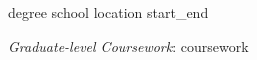 

\begin{cventries}

  \cventry
    { {{degree}} } %
    { {{school}} } %
    { {{location}} } %
    { {{start_end}} } %
    {
      \begin{cvitems} %
        \item {\textit{Graduate-level Coursework}: {{coursework}} }
      \end{cvitems}
    }
\end{cventries}
